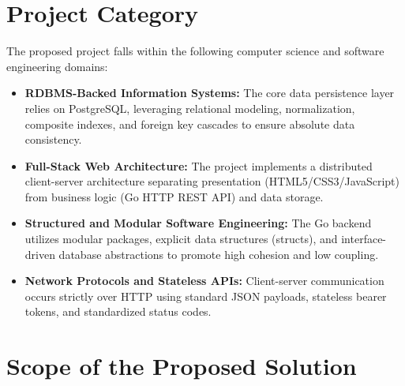 \documentclass[11pt,a4paper]{report}
\begin{document}
\section{Project Category}
The proposed project falls within the following computer science and software engineering domains:
\begin{itemize}
  \item \textbf{RDBMS-Backed Information Systems:} The core data persistence layer relies on PostgreSQL, leveraging relational modeling, normalization, composite indexes, and foreign key cascades to ensure absolute data consistency.
  \item \textbf{Full-Stack Web Architecture:} The project implements a distributed client-server architecture separating presentation (HTML5/CSS3/JavaScript) from business logic (Go HTTP REST API) and data storage.
  \item \textbf{Structured and Modular Software Engineering:} The Go backend utilizes modular packages, explicit data structures (structs), and interface-driven database abstractions to promote high cohesion and low coupling.
  \item \textbf{Network Protocols and Stateless APIs:} Client-server communication occurs strictly over HTTP using standard JSON payloads, stateless bearer tokens, and standardized status codes.
\end{itemize}

\section{Scope of the Proposed Solution}
\end{document}

